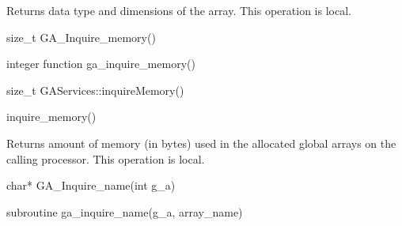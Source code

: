 \documentclass[12pt]{article}
\begin{document}
\begin{desc}

Returns data type and dimensions of the array.
This operation is local.


\begin{capi}
\begin{ccode}
size_t GA_Inquire_memory()
\end{ccode}
\end{capi}

\begin{fapi}
\begin{fcode}
integer function ga_inquire_memory()
\end{fcode}
\end{fapi}

\begin{cxxapi}
\begin{cxxcode}
size_t GAServices::inquireMemory()
\end{cxxcode}
\end{cxxapi}

\begin{pyapi}
\begin{pycode}
inquire_memory()
\end{pycode}
\end{pyapi}


Returns amount of memory (in bytes) used in the allocated global arrays on
the calling processor.
This operation is local.

\end{desc}


\begin{capi}
\begin{ccode}
char* GA_Inquire_name(int g_a)
\end{ccode}
\begin{funcargs}
\end{funcargs}
\end{capi}

\begin{fapi}
\begin{fcode}
subroutine ga_inquire_name(g_a, array_name)
\end{fcode}
\begin{funcargs}
\end{funcargs}
\end{fapi}
\end{document}
